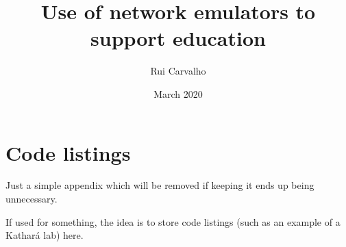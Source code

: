 \documentclass[a4paper,11pt]{book}
\title{Use of network emulators to support education}
\author{Rui Carvalho}
\date{March 2020}
\begin{document}
\frontmatter
  
  
  
  
  
  \tableofcontents
  \listoffigures
  \listoftables
  \printglossary[type=\acronymtype]
  \printglossary
\mainmatter

  
  
  
  
  
  
  

  \appendix
  \chapter{Code listings}
  Just a simple appendix which will be removed if keeping it
  ends up being unnecessary.

  If used for something, the idea is to store code listings
  (such as an example of a Kathará lab) here.
\backmatter
  \printbibliography[heading=bibintoc]
\end{document}
